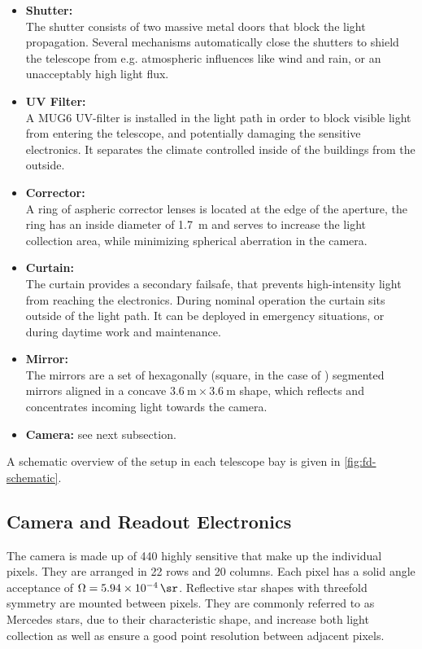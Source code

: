 \begin{itemize}
  \item \textbf{Shutter:} \\
  The shutter consists of two massive metal doors that block the light 
  propagation. Several mechanisms automatically close the shutters to shield the 
  telescope from e.g. atmospheric influences like wind and rain, or an 
  unacceptably high light flux.
  \item \textbf{UV Filter:} \\
  A MUG6 UV-filter is installed in the light path in order to block visible 
  light from entering the telescope, and potentially damaging the sensitive 
  electronics. It separates the climate controlled inside of the \FD buildings 
  from the outside.
  \item \textbf{Corrector:} \\
  A ring of aspheric corrector lenses is located at the edge of the aperture,
  the ring has an inside diameter of \SI{1.7}{\meter} and serves to increase 
  the light collection area, while minimizing spherical aberration in the 
  camera.
  \item \textbf{Curtain:} \\
  The curtain provides a secondary failsafe, that prevents high-intensity light 
  from reaching the electronics. During nominal operation the curtain sits outside 
  of the light path. It can be deployed in emergency situations, or during daytime
  work and maintenance.
  \item \textbf{Mirror:} \\
  The mirrors are a set of hexagonally (square, in the case of \LL) segmented 
  mirrors aligned in a concave $\SI{3.6}{\meter}\times\SI{3.6}{\meter}$ shape, 
  which reflects and concentrates incoming light towards the camera.
  \item \textbf{Camera:} see next subsection.
\end{itemize}

A schematic overview of the setup in each telescope bay is given in
\cref{fig:fd-schematic}.

\subsection{Camera and Readout Electronics}

The camera is made up of 440 highly sensitive \PMTs that make up the individual
pixels. They are arranged in 22 rows and 20 columns. Each pixel has a solid angle 
acceptance of $\Omega = \SI{5.94e-4}{\sr}$. Reflective star shapes with threefold 
symmetry are mounted between pixels. They are commonly referred to as Mercedes 
stars, due to their characteristic shape, and increase both light collection as 
well as ensure a good point resolution between adjacent pixels.

